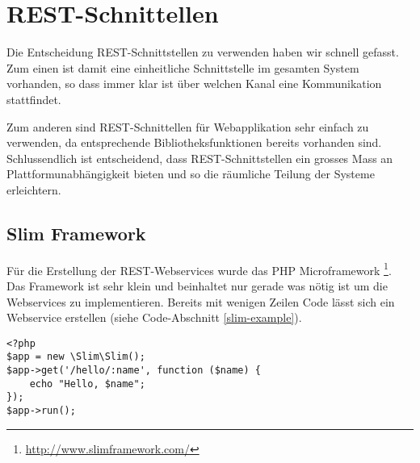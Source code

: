 \section{REST-Schnittellen}
Die Entscheidung \gls{REST}-Schnittstellen zu verwenden haben wir schnell gefasst. 
Zum einen ist damit eine einheitliche Schnittstelle im gesamten System vorhanden, so dass immer klar ist über welchen Kanal eine Kommunikation stattfindet.

Zum anderen sind \gls{REST}-Schnittellen für Webapplikation sehr einfach zu verwenden, da entsprechende Bibliotheksfunktionen bereits vorhanden sind.
Schlussendlich ist entscheidend, dass \gls{REST}-Schnittstellen ein grosses Mass an Plattformunabhängigkeit bieten und so die räumliche Teilung der Systeme erleichtern.

\subsection{Slim Framework}
Für die Erstellung der \gls{REST}-Webservices wurde das PHP Microframework \footnote{\url{http://www.slimframework.com/}}.
Das Framework ist sehr klein und beinhaltet nur gerade was nötig ist um die Webservices zu implementieren.
Bereits mit wenigen Zeilen Code lässt sich ein Webservice erstellen (siehe Code-Abschnitt \ref{slim-example}).

\lstset{language=PHP}
\begin{lstlisting}[caption=Beispiel REST-Webservice in Slim, label=slim-example]
<?php
$app = new \Slim\Slim();
$app->get('/hello/:name', function ($name) {
    echo "Hello, $name";
});
$app->run();
\end{lstlisting}













